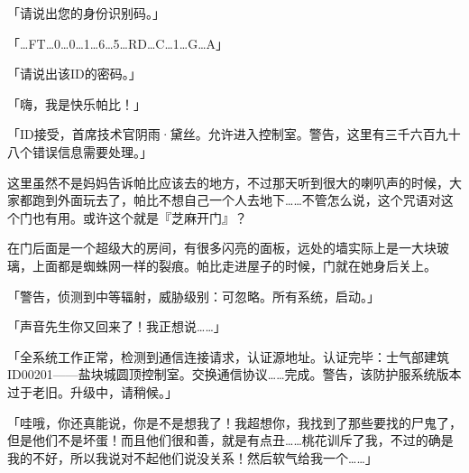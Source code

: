 





{\mt 「请说出您的身份识别码。」}

「\dots FT\dots 0\dots 0\dots 1\dots 6\dots 5\dots RD\dots C\dots 1\dots G\dots A」



{\mt 「请说出该ID的密码。」}


「嗨，我是快乐帕比！」

{\mt 「ID接受，首席技术官阴雨·黛丝。允许进入控制室。警告，这里有三千六百九十八个错误信息需要处理。」}




这里虽然不是妈妈告诉帕比应该去的地方，不过那天听到很大的喇叭声的时候，大家都跑到外面玩去了，帕比不想自己一个人去地下……不管怎么说，这个咒语对这个门也有用。或许这个就是『芝麻开门』？

在门后面是一个超级大的房间，有很多闪亮的面板，远处的墙实际上是一大块玻璃，上面都是蜘蛛网一样的裂痕。帕比走进屋子的时候，门就在她身后关上。

「{\mt 警告，侦测到中等辐射，威胁级别：可忽略。所有系统，启动。}」

「声音先生你又回来了！我正想说……」

「{\mt 全系统工作正常，检测到通信连接请求，认证源地址。认证完毕：士气部建筑ID00201——盐块城圆顶控制室。交换通信协议……完成。警告，该防护服系统版本过于老旧。升级中，请稍候。}」

「哇哦，你还真能说，你是不是想我了！我超想你，我找到了那些要找的尸鬼了，但是他们不是坏蛋！而且他们很和善，就是有点丑……桃花训斥了我，不过的确是我的不好，所以我说对不起他们说没关系！然后软气给我一个……」

